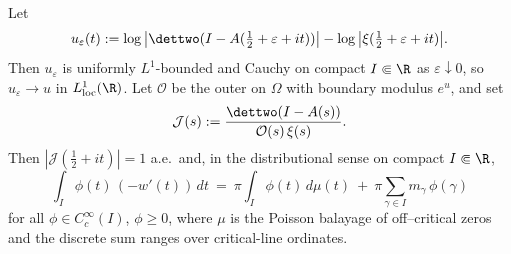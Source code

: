 \begin{theorem}\label{thm:phase-velocity-quant}
Let
\[
 u_\varepsilon(t):=\log\big|\dettwo(I-A(\tfrac12+\varepsilon+it))\big|-\log\big|\xi(\tfrac12+\varepsilon+it)\big|.
\]
Then \(u_\varepsilon\) is uniformly \(L^1\)-bounded and Cauchy on compact \(I\Subset\R\) as \(\varepsilon\downarrow 0\), so \(u_\varepsilon\to u\) in \(L^1_{\rm loc}(\R)\).
Let \(\mathcal O\) be the outer on \(\Omega\) with boundary modulus \(e^{u}\), and set
\[
  \mathcal J(s):=\frac{\dettwo(I-A(s))}{\mathcal O(s)\,\xi(s)}.
\]
Then \(|\mathcal J(\tfrac12+it)|=1\) a.e.\ and, in the distributional sense on compact \(I\Subset\R\),
\begin{equation}\label{eq:pv-identity}
  \int_I \phi(t)\,(-w'(t))\,dt\ =\ \pi\!\int_I \phi(t)\,d\mu(t)\ +\ \pi\sum_{\gamma\in I} m_\gamma\,\phi(\gamma)
\end{equation}
for all \(\phi\in C_c^\infty(I)\), \(\phi\ge 0\), where \(\mu\) is the Poisson balayage of off--critical zeros and the discrete sum ranges over critical-line ordinates.
\end{theorem}
